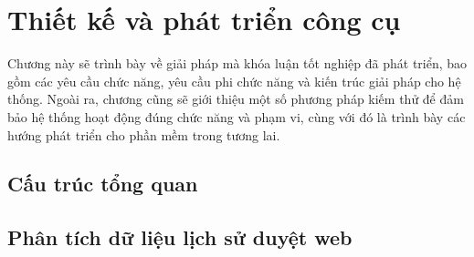 \chapter{Thiết kế và phát triển công cụ} 
\label{chap:implement}
Chương này sẽ trình bày về giải pháp mà khóa luận tốt nghiệp đã phát triển, bao gồm các yêu cầu chức năng, yêu cầu phi chức năng và kiến trúc giải pháp cho hệ thống. Ngoài ra, chương cũng sẽ giới thiệu một số phương pháp kiếm thử để đảm bảo hệ thống hoạt động đúng chức năng và phạm vi, cùng với đó là trình bày các hướng phát triển cho phần mềm trong tương lai.

\section{Cấu trúc tổng quan}

\section{Phân tích dữ liệu lịch sử duyệt web}



